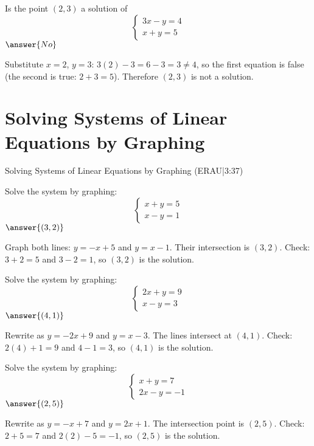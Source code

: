 \documentclass{ximera}
\begin{document}
\begin{problem}
Is the point $(2,3)$ a solution of
\[
\begin{cases}
3x - y = 4\\
x + y = 5
\end{cases}
\]
$\answer{No}$
\begin{feedback}
Substitute $x=2$, $y=3$: $3(2)-3=6-3=3\neq4$, so the first equation is false (the second is true: $2+3=5$). Therefore $(2,3)$ is not a solution.
\end{feedback}
\end{problem}


\section*{Solving Systems of Linear Equations by Graphing}

Solving Systems of Linear Equations by Graphing (ERAU|3:37)


\begin{problem}
Solve the system by graphing:
\[
\begin{cases}
x + y = 5\\
x - y = 1
\end{cases}
\]
$\answer{(3,2)}$
\begin{feedback}
Graph both lines: $y = -x + 5$ and $y = x - 1$. Their intersection is $(3,2)$. Check: $3+2=5$ and $3-2=1$, so $(3,2)$ is the solution.
\end{feedback}
\end{problem}

\begin{problem}
Solve the system by graphing:
\[
\begin{cases}
2x + y = 9\\
x - y = 3
\end{cases}
\]
$\answer{(4,1)}$
\begin{feedback}
Rewrite as $y = -2x + 9$ and $y = x - 3$. The lines intersect at $(4,1)$. Check: $2(4)+1=9$ and $4-1=3$, so $(4,1)$ is the solution.
\end{feedback}
\end{problem}

\begin{problem}
Solve the system by graphing:
\[
\begin{cases}
x + y = 7\\
2x - y = -1
\end{cases}
\]
$\answer{(2,5)}$
\begin{feedback}
Rewrite as $y = -x + 7$ and $y = 2x + 1$. The intersection point is $(2,5)$. Check: $2+5=7$ and $2(2)-5=-1$, so $(2,5)$ is the solution.
\end{feedback}
\end{problem}
\end{document}
